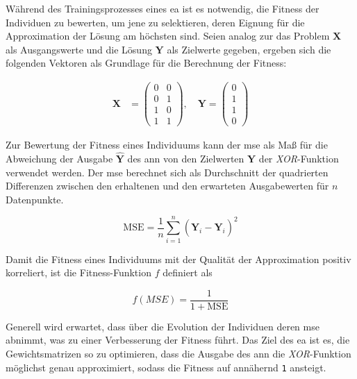 Während des Trainingsprozesses eines \Gls{ea} ist es notwendig, die Fitness der Individuen zu bewerten, um jene zu selektieren, deren Eignung für die Approximation der Lösung am höchsten sind. Seien analog zur  das Problem $\mathbf{X}$ als Ausgangswerte und die Lösung $\mathbf{Y}$ als Zielwerte gegeben, ergeben sich die folgenden Vektoren als Grundlage für die Berechnung der Fitness:

\begin{equation}
    \begin{aligned}
        \mathbf{X} &=
        \begin{pmatrix}
            0 & 0 \\
            0 & 1 \\
            1 & 0 \\
            1 & 1
        \end{pmatrix}, \quad
        \mathbf{Y} =
        \begin{pmatrix}
            0 \\
            1 \\
            1 \\
            0
        \end{pmatrix}
    \end{aligned}
    \label{eq:03-02-03_input-output-vectors}
\end{equation}

Zur Bewertung der Fitness eines Individuums kann der \Gls{mse} als Maß für die Abweichung der Ausgabe $\hat{\mathbf{Y}}$ des \Gls{ann} von den Zielwerten $\mathbf{Y}$ der \textit{XOR}-Funktion verwendet werden. Der \Gls{mse} berechnet sich als Durchschnitt der quadrierten Differenzen zwischen den erhaltenen und den erwarteten Ausgabewerten für $n$ Datenpunkte.

\begin{equation}
    \mathrm{MSE} = \frac{1}{n} \sum_{i=1}^{n} (\hat{\mathbf{Y}}_i - \mathbf{Y}_i)^2
    \label{eq:03-02-03_mse-fitness-function}
\end{equation}

Damit die Fitness eines Individuums mit der Qualität der Approximation positiv korreliert, ist die Fitness-Funktion $f$ definiert als

\begin{equation}
    f(MSE) = \frac{1}{1 + \mathrm{MSE}}
    \label{eq:03-02-03_fitness-function}
\end{equation}

Generell wird erwartet, dass über die Evolution der Individuen deren \Gls{mse} abnimmt, was zu einer Verbesserung der Fitness führt. Das Ziel des \Gls{ea} ist es, die Gewichtsmatrizen so zu optimieren, dass die Ausgabe des \Gls{ann} die \textit{XOR}-Funktion möglichst genau approximiert, sodass die Fitness auf annähernd \texttt{1} ansteigt.


